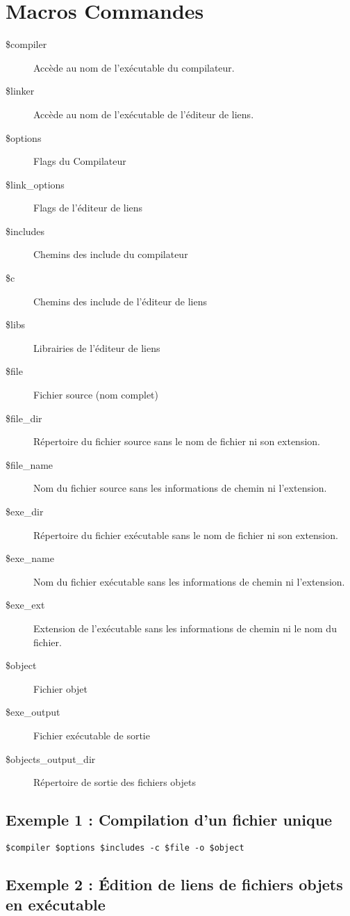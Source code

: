 \section{Macros Commandes}\label{sec:command_macros}

\begin{description}
\item[\$compiler] Accède au nom de l'exécutable du compilateur.
\item[\$linker] Accède au nom de l'exécutable de l'éditeur de liens.
\item[\$options] Flags du Compilateur
\item[\$link\_options] Flags de l'éditeur de liens
\item[\$includes] Chemins des include du compilateur
\item[\$c] Chemins des include de l'éditeur de liens
\item[\$libs] Librairies de l'éditeur de liens
\item[\$file] Fichier source (nom complet)
\item[\$file\_dir] Répertoire du fichier source sans le nom de fichier ni son extension.
\item[\$file\_name] Nom du fichier source sans les informations de chemin ni l'extension.
\item[\$exe\_dir] Répertoire du fichier exécutable sans le nom de fichier ni son extension.
\item[\$exe\_name] Nom du fichier exécutable sans les informations de chemin ni l'extension.
\item[\$exe\_ext] Extension de l'exécutable sans les informations de chemin ni le nom du fichier.
\item[\$object] Fichier objet
\item[\$exe\_output] Fichier exécutable de sortie
\item[\$objects\_output\_dir] Répertoire de sortie des fichiers objets
\end{description}

\subsection{Exemple 1 : Compilation d'un fichier unique}

\begin{lstlisting}
$compiler $options $includes -c $file -o $object
\end{lstlisting}

\subsection{Exemple 2 : Édition de liens de fichiers objets en exécutable}

